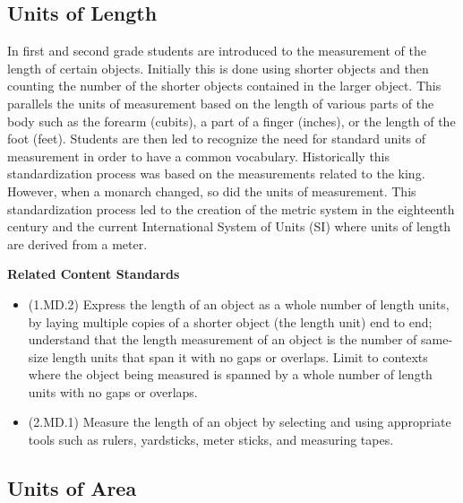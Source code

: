 \documentclass[
]{book}
\providecommand{\tightlist}{%
  \setlength{\itemsep}{0pt}\setlength{\parskip}{0pt}}
\newenvironment{standards}{}{}
\theoremstyle{definition}
\theoremstyle{definition}
\theoremstyle{definition}
\theoremstyle{definition}
\theoremstyle{remark}
\begin{document}
\hypertarget{units-of-length}{%
\subsection{Units of Length}\label{units-of-length}}

In first and second grade students are introduced to the measurement of the length of certain objects. Initially this is done using shorter objects and then counting the number of the shorter objects contained in the larger object. This parallels the units of measurement based on the length of various parts of the body such as the forearm (cubits), a part of a finger (inches), or the length of the foot (feet). Students are then led to recognize the need for standard units of measurement in order to have a common vocabulary. Historically this standardization process was based on the measurements related to the king. However, when a monarch changed, so did the units of measurement. This standardization process led to the creation of the metric system in the eighteenth century and the current International System of Units (SI) where units of length are derived from a meter.

\begin{standards}

\begin{center}
\textbf{Related Content Standards}

\end{center}

\begin{itemize}
\tightlist
\item
  (1.MD.2) Express the length of an object as a whole number of length units, by laying multiple copies of a shorter object (the length unit) end to end; understand that the length measurement of an object is the number of same-size length units that span it with no gaps or overlaps. Limit to contexts where the object being measured is spanned by a whole number of length units with no gaps or overlaps.
\item
  (2.MD.1) Measure the length of an object by selecting and using appropriate tools such as rulers, yardsticks, meter sticks, and measuring tapes.
\end{itemize}

\end{standards}

\hypertarget{units-of-area}{%
\subsection{Units of Area}\label{units-of-area}}
\end{document}
